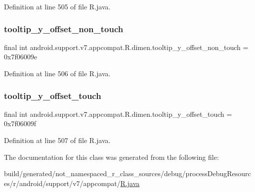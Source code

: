 Definition at line 505 of file R.\+java.

\mbox{\label{classandroid_1_1support_1_1v7_1_1appcompat_1_1_r_1_1dimen_ac3ddf695b8b86c3ab7c1605b1f1e727c}} 
\subsubsection{\texorpdfstring{tooltip\_y\_offset\_non\_touch}{tooltip\_y\_offset\_non\_touch}}
{\footnotesize\ttfamily final int android.\+support.\+v7.\+appcompat.\+R.\+dimen.\+tooltip\+\_\+y\+\_\+offset\+\_\+non\+\_\+touch = 0x7f06009e\hspace{0.3cm}{\ttfamily [static]}}



Definition at line 506 of file R.\+java.

\mbox{\label{classandroid_1_1support_1_1v7_1_1appcompat_1_1_r_1_1dimen_af398f083a7bf2c5553c7f9f8e66f2cdc}} 
\subsubsection{\texorpdfstring{tooltip\_y\_offset\_touch}{tooltip\_y\_offset\_touch}}
{\footnotesize\ttfamily final int android.\+support.\+v7.\+appcompat.\+R.\+dimen.\+tooltip\+\_\+y\+\_\+offset\+\_\+touch = 0x7f06009f\hspace{0.3cm}{\ttfamily [static]}}



Definition at line 507 of file R.\+java.



The documentation for this class was generated from the following file\+:\begin{DoxyCompactItemize}
\item 
build/generated/not\+\_\+namespaced\+\_\+r\+\_\+class\+\_\+sources/debug/process\+Debug\+Resources/r/android/support/v7/appcompat/\mbox{\hyperlink{android_2support_2v7_2appcompat_2_r_8java}{R.\+java}}\end{DoxyCompactItemize}
